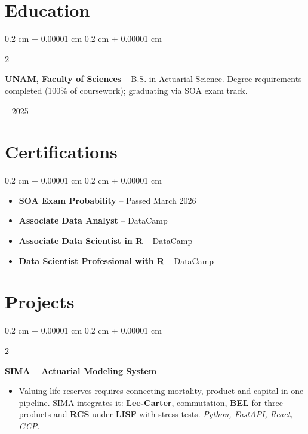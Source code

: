 \documentclass[10pt, letterpaper]{article}
\newenvironment{highlights}{
    \begin{itemize}[
        topsep=0.05 cm,
        parsep=0.05 cm,
        partopsep=0pt,
        itemsep=0pt,
        leftmargin=0.4 cm + 10pt
    ]
}{
    \end{itemize}
}
\newenvironment{highlightsforbulletentries}{
    \begin{itemize}[
        topsep=0.02 cm,
        parsep=0.05 cm,
        partopsep=0pt,
        itemsep=0pt,
        leftmargin=10pt
    ]
}{
    \end{itemize}
}
\newenvironment{onecolentry}{
    \begin{adjustwidth}{
        0.2 cm + 0.00001 cm
    }{
        0.2 cm + 0.00001 cm
    }
}{
    \end{adjustwidth}
}
\newenvironment{twocolentry}[2][]{
    \onecolentry
    \def\secondColumn{#2}
    \setcolumnwidth{\fill, 4.0 cm}
    \begin{paracol}{2}
}{
    \switchcolumn \raggedleft \secondColumn
    \end{paracol}
    \endonecolentry
}
\newenvironment{twocolentrynarrow}[2][]{
    \onecolentry
    \def\secondColumn{#2}
    \setcolumnwidth{\fill, 2.2 cm}
    \begin{paracol}{2}
}{
    \switchcolumn \raggedleft \secondColumn
    \end{paracol}
    \endonecolentry
}
\newcommand{\hl}[1]{\textcolor{primaryColor}{\textbf{#1}}}
\let\hrefWithoutArrow\href
\renewcommand{\href}[2]{\hrefWithoutArrow{#1}{\ifthenelse{\equal{#2}{}}{ }{#2 }\raisebox{.15ex}{\footnotesize \faExternalLink*}}}
\begin{document}
    \section{Education}

        \begin{twocolentry}{2021 -- 2025}
            \textbf{UNAM, Faculty of Sciences} -- B.S. in Actuarial Science. Degree requirements completed (100\% of coursework); graduating via SOA exam track.
        \end{twocolentry}

    \section{Certifications}

    \begin{onecolentry}
        \begin{highlightsforbulletentries}
            \item \textbf{SOA Exam Probability} -- Passed March 2026 \href{https://drive.google.com/file/d/1rt3emgBnPpQi7NiXkBQeA5WwJTV0JuAf/view?usp=sharing}{}
            \item \textbf{Associate Data Analyst} -- DataCamp \href{https://drive.google.com/drive/folders/1-QUuVH3zPBPsl6RhUvuUWxpZkP1i8TYb?usp=sharing}{}
            \item \textbf{Associate Data Scientist in R} -- DataCamp \href{https://drive.google.com/file/d/1xVLk15A1LBbyXH1fZnd4eBTaJ4d8FLLO/view?usp=drive_link}{}
            \item \textbf{Data Scientist Professional with R} -- DataCamp \href{https://drive.google.com/file/d/1Woe6xqxofloFZ9uM2f5VsdGxY-WQWCRI/view?usp=drive_link}{}
        \end{highlightsforbulletentries}
    \end{onecolentry}


    \section{Projects}

\begin{twocolentrynarrow}{\href{https://sima-d3qj5vwxtq-uc.a.run.app}{app live}}
    \textbf{SIMA -- Actuarial Modeling System}
    \begin{highlights}
        \item Valuing life reserves requires connecting mortality, product and capital in one pipeline. SIMA integrates it: \hl{Lee-Carter}, commutation, \hl{BEL} for three products and \hl{RCS} under \hl{LISF} with stress tests. \textit{Python, FastAPI, React, GCP.}
    \end{highlights}
\end{twocolentrynarrow}
\end{document}

